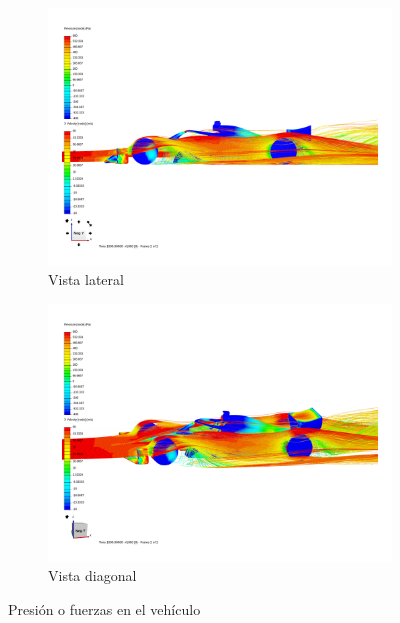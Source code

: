 \documentclass[colTwo]{NanouparIEEE}
\begin{document}
\begin{figure}[htbp]
                \\
                \begin{subfigure}[b]{0.235\textwidth}
                    \includegraphics[width=\textwidth]{images/Image_7-Lateral.png}
                    \caption{Vista lateral}
                    \label{subFig.lateral}
                \end{subfigure}
                \hfill
                \begin{subfigure}[b]{0.235\textwidth}
                    \includegraphics[width=\textwidth]{images/Image_8-Diagonal.png}
                    \caption{Vista diagonal}
                    \label{subFig.diagonal}
                \end{subfigure}
                \caption{Presión o fuerzas en el vehículo}
                \label{Fig.densidad_nodos_alta}
            \end{figure}
\end{document}
